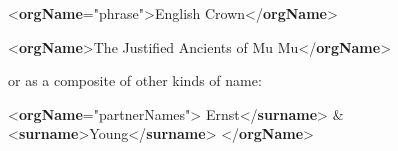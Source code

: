 \begin{shaded}
{<\textbf{orgName}\hspace*{1em}{type}="{phrase}">}English Crown{</\textbf{orgName}>}\end{shaded}\egroup\par \noindent  \par\bgroup{}\exampleFont \begin{shaded}\noindent\mbox{}{<\textbf{orgName}>}The Justified Ancients of Mu Mu{</\textbf{orgName}>}\end{shaded}\egroup\par \noindent  or as a composite of other kinds of name: \par\bgroup{}\exampleFont \begin{shaded}\noindent\mbox{}{<\textbf{orgName}\hspace*{1em}{type}="{partnerNames}">}\mbox{}\newline 
{}Ernst{</\textbf{surname}>} \& {<\textbf{surname}>}Young{</\textbf{surname}>}\mbox{}\newline 
{</\textbf{orgName}>}\end{shaded}\egroup\par \par
